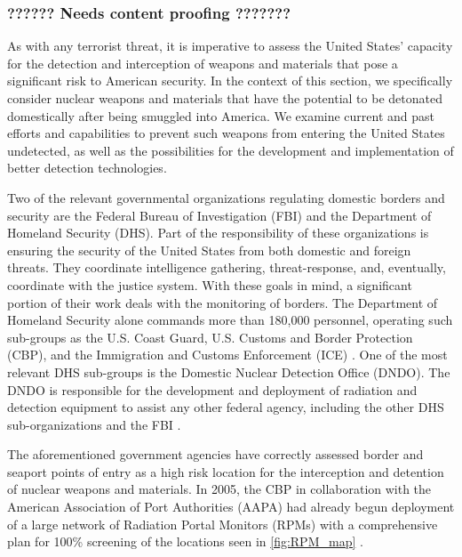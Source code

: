 \documentclass{report}
\begin{document}
\subsubsection{??????  Needs content proofing ???????}


As with any terrorist threat, it is imperative to assess the United States' capacity for the detection and interception of weapons and materials that pose a significant risk to American security. In the context of this section, we specifically consider nuclear weapons and materials that have the potential to be detonated domestically after being smuggled into America. We examine current and past efforts and capabilities to prevent such weapons from entering the United States undetected, as well as the possibilities for the development and implementation of better detection technologies. 

Two of the relevant governmental organizations regulating domestic borders and security are the Federal Bureau of Investigation (FBI) and the Department of Homeland Security (DHS). Part of the responsibility of these organizations is ensuring the security of the United States from both domestic and foreign threats. They coordinate intelligence gathering, threat-response, and, eventually, coordinate with the justice system. With these goals in mind, a significant portion of their work deals with the monitoring of borders. The Department of Homeland Security alone commands more than 180,000 personnel, operating such sub-groups as the U.S. Coast Guard, U.S. Customs and Border Protection (CBP), and the Immigration and Customs Enforcement (ICE) \cite{Robb2005}. One of the most relevant DHS sub-groups is the Domestic Nuclear Detection Office (DNDO). The DNDO is responsible for the development and deployment of radiation and detection equipment to assist any other federal agency, including the other DHS sub-organizations and the FBI \cite{UnitedStatesGovernmentAccountabilityOffice2013}. 

The aforementioned government agencies have correctly assessed border and seaport points of entry as a high risk location for the interception and detention of nuclear weapons and materials. In 2005, the CBP in collaboration with the American Association of Port Authorities (AAPA) had already begun deployment of a large network of Radiation Portal Monitors (RPMs) with a comprehensive plan for 100\% screening of the locations seen in \autoref{fig:RPM_map} \cite{Simmons2005}. 
\end{document}
